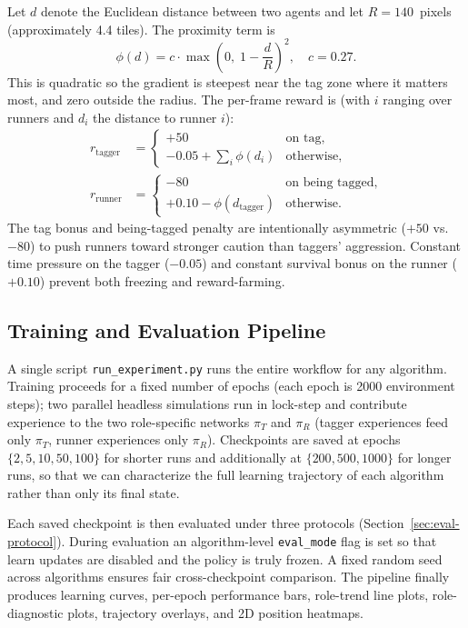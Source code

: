 \documentclass[conference]{IEEEtran}
\begin{document}
Let $d$ denote the Euclidean distance between two agents and let
$R = 140$~pixels (approximately 4.4 tiles). The proximity term is
\begin{equation}
\phi(d) = c \cdot \max\!\left(0,\; 1 - \frac{d}{R}\right)^{2},
\quad c = 0.27.
\label{eq:phi}
\end{equation}
This is quadratic so the gradient is steepest near the tag zone where it
matters most, and zero outside the radius. The per-frame reward is (with
$i$ ranging over runners and $d_i$ the distance to runner $i$):
\begin{align}
r_{\text{tagger}} &=
    \begin{cases}
        +50 & \text{on tag,}\\
        -0.05 + \displaystyle\sum_{i} \phi(d_i) & \text{otherwise,}
    \end{cases}\\
r_{\text{runner}} &=
    \begin{cases}
        -80 & \text{on being tagged,}\\
        +0.10 - \phi(d_{\text{tagger}}) & \text{otherwise.}
    \end{cases}
\end{align}
The tag bonus and being-tagged penalty are intentionally asymmetric ($+50$
vs.\ $-80$) to push runners toward stronger caution than taggers' aggression.
Constant time pressure on the tagger ($-0.05$) and constant survival bonus
on the runner ($+0.10$) prevent both freezing and reward-farming.

\subsection{Training and Evaluation Pipeline}

A single script \texttt{run\_experiment.py} runs the entire workflow for any
algorithm. Training proceeds for a fixed number of epochs (each epoch is 2000
environment steps); two parallel headless simulations run in lock-step and
contribute experience to the two role-specific networks $\pi_T$ and $\pi_R$
(tagger experiences feed only $\pi_T$, runner experiences only $\pi_R$).
Checkpoints are saved at epochs $\{2, 5, 10, 50, 100\}$ for shorter runs
and additionally at $\{200, 500, 1000\}$ for longer runs, so that we can
characterize the full learning trajectory of each algorithm rather than
only its final state.

Each saved checkpoint is then evaluated under three protocols
(Section~\ref{sec:eval-protocol}). During evaluation an algorithm-level
\texttt{eval\_mode} flag is set so that learn updates are disabled and the
policy is truly frozen. A fixed random seed across algorithms ensures fair
cross-checkpoint comparison. The pipeline finally produces learning curves,
per-epoch performance bars, role-trend line plots, role-diagnostic plots,
trajectory overlays, and 2D position heatmaps.
\end{document}
